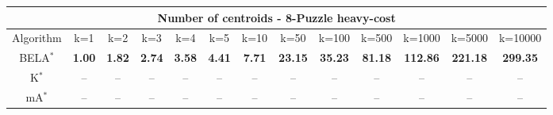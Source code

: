 \begin{tabular}{c|cccccccccccc}\toprule
\multicolumn{13}{c}{Number of centroids - 8-Puzzle heavy-cost}\\ \midrule
Algorithm & k=1 & k=2 & k=3 & k=4 & k=5 & k=10 & k=50 & k=100 & k=500 & k=1000 & k=5000 & k=10000 \\ \midrule
BELA$^*$ & \textbf{1.00} & \textbf{1.82} & \textbf{2.74} & \textbf{3.58} & \textbf{4.41} & \textbf{7.71} & \textbf{23.15} & \textbf{35.23} & \textbf{81.18} & \textbf{112.86} & \textbf{221.18} & \textbf{299.35} \\
K$^*$ & -- & -- & -- & -- & -- & -- & -- & -- & -- & -- & -- & -- \\
mA$^*$ & -- & -- & -- & -- & -- & -- & -- & -- & -- & -- & -- & -- \\ \bottomrule 
\end{tabular}
